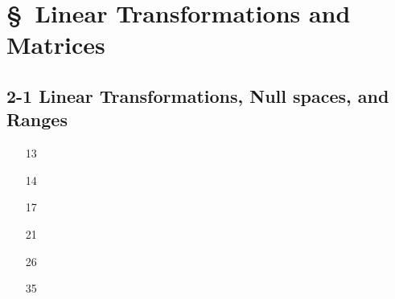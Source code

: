 



\cfoot{\thepage} %

\section*{\S \ Linear Transformations
and Matrices}
\subsection*{2-1 Linear Transformations, Null spaces, and Ranges} 
 
 \begin{enumerate}
   \item[13] 
   \newpage
   \item[14] 
   \newpage
   \item[17] 
   \newpage
   \item[21] 
   \newpage
   \item[26] 
   \newpage
   \item[35] 
   
 \end{enumerate}

